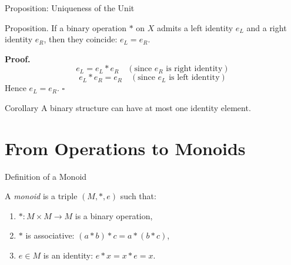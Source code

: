 \documentclass[11pt,aspectratio=43,ignorenonframetext,t]{beamer}
\begin{document}
\begin{frame}{Proposition: Uniqueness of the Unit}
\begin{block}{Proposition.}  
If a binary operation \( * \) on \( X \) admits a left identity \(e_L\) and a right identity \(e_R\),
then they coincide: \(e_L = e_R\).

\textbf{Proof.}
\[
e_L = e_L * e_R \quad (\text{since } e_R \text{ is right identity})
\]
\[
e_L * e_R = e_R \quad (\text{since } e_L \text{ is left identity})
\]
Hence \(e_L = e_R.\) \(\square\)
\end{block}

\begin{block}{Corollary}
A binary structure can have at most one identity element.
\end{block}
\end{frame}

\section{From Operations to Monoids}

\begin{frame}{Definition of a Monoid}
\vspace{-0.3cm}
\begin{block}{}  
A \emph{monoid} is a triple \((M, *, e)\) such that:
\begin{enumerate}
  \item \( * : M \times M \to M\) is a binary operation,
  \item \( * \) is associative: \((a*b)*c = a*(b*c)\),
  \item \( e \in M \) is an identity: \(e * x = x * e = x\).
\end{enumerate}
\end{block}

\begin{center}
\end{center}
\end{frame}
\end{document}
